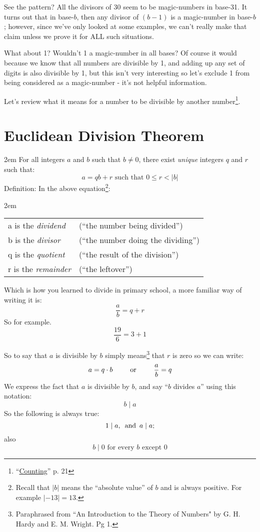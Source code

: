 \documentclass{article}
\newenvironment{jprIn}{\begin{adjustwidth}{2em}{}}{\end{adjustwidth}}
\begin{document}
See the pattern? All the divisors of 30 seem to be magic-numbers in base-31.
It turns out that in base-$b$, then any divisor of $(b-1)$ is a magic-number in base-$b$;
however, since we've only looked at some examples, we can't really make that claim unless we prove it for ALL
such situations.

What about 1? Wouldn't 1 a magic-number in all bases? Of course it would because
we know that all numbers are divisible by 1, and adding up any set of digits is also 
divisible by 1, but this isn't very interesting
so let's exclude 1 from being considered as a magic-number - it's not helpful information.

Let's review what it means for a number to be divisible 
by another
number\footnote{``\href {https://www.dropbox.com/s/bwmrffmkcidnf27/basisReprThm.pdf?dl=0} {Counting}'' p. 21}.

\break
\section*{Euclidean Division Theorem}
\begin{jprIn}
For all integers $a$ and $b$ such that $b\ne0$,
there exist \emph{unique} integers $q$ and $r$ such that:
\[a=qb+r  \text{ such that } 0\le{}r<\lvert{}b\rvert\]
Definition: In the above equation\footnote{Recall
that $\lvert{}b\rvert$ means the ``absolute value'' of $b$ and is always positive. For
example $\lvert{}{-13}\rvert = 13$.}:
\begin{jprIn}
\begin{tabular}{l l}
a is the \emph{dividend} & (``the number being divided'')\\
b is the \emph{divisor} & (``the number doing the dividing'')\\
q is the \emph{quotient} & (``the result of the division'')\\
r is the \emph{remainder} & (``the leftover'')
\end{tabular}
\end{jprIn}
\end{jprIn}

Which is how you learned to divide in primary school, a more familiar way of writing it is:
\[\frac{a}{b}=q+r\]
So for example.
\[\frac{19}{6}=3+1\]

So to say that $a$ is divisible by $b$ simply means\footnote{Paraphrased
from ``An Introduction to the Theory of Numbers" by G. H. Hardy
and E. M. Wright. Pg 1.}
that $r$ is zero
so we can write:
\[a=q\cdot{}b\text{\hspace{2.5em}or\hspace{2.5em}}\frac{a}{b}=q\]
We express the fact that $a$ is divisible by $b$, and say
``$b$ divides $a$'' using this notation:
\[b\mid{}a\]
So the following is always true:
\[1\mid{}a,
\text{\hspace{0.5em}and\hspace{0.5em}}a\mid{}a;\]
also
\[b\mid{}0\text{ for every }b\text{ except }0\]
\end{document}
